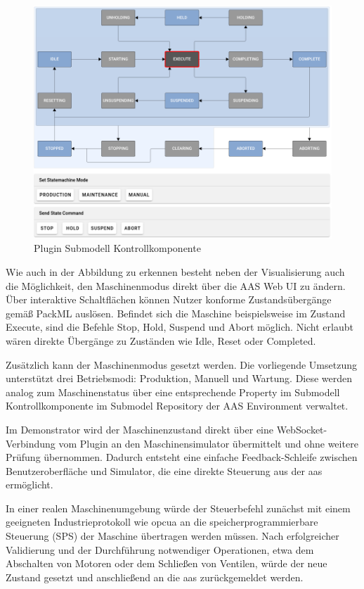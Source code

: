 \begin{figure}[htbp] 
    \centering 
        \includegraphics[width=1\textwidth]{Bilder/Ergebnisse/DynamischeDaten/Kontrollkomponente/PackMl.PNG} 
    \caption{Plugin Submodell Kontrollkomponente} 
    \label{fig:PackMLZustandsautomat} 
\end{figure}

Wie auch in der Abbildung zu erkennen besteht neben der Visualisierung auch die Möglichkeit, den Maschinenmodus direkt über die AAS Web UI zu ändern. 
Über interaktive Schaltflächen können Nutzer konforme Zustandsübergänge gemäß PackML auslösen. 
Befindet sich die Maschine beispielsweise im Zustand Execute, sind die Befehle Stop, Hold, Suspend und Abort möglich. 
Nicht erlaubt wären direkte Übergänge zu Zuständen wie Idle, Reset oder Completed.

Zusätzlich kann der Maschinenmodus gesetzt werden. 
Die vorliegende Umsetzung unterstützt drei Betriebsmodi: Produktion, Manuell und Wartung. 
Diese werden analog zum Maschinenstatus über eine entsprechende Property im Submodell Kontrollkomponente im Submodel Repository der AAS Environment verwaltet.

Im Demonstrator wird der Maschinenzustand direkt über eine WebSocket-Verbindung vom Plugin an den Maschinensimulator übermittelt und ohne weitere Prüfung übernommen. 
Dadurch entsteht eine einfache Feedback-Schleife zwischen Benutzeroberfläche und Simulator, die eine direkte Steuerung aus der \acs{aas} ermöglicht.

In einer realen Maschinenumgebung würde der Steuerbefehl zunächst mit einem geeigneten Industrieprotokoll wie \acs{opcua} an die speicherprogrammierbare Steuerung (SPS) der Maschine übertragen werden müssen. 
Nach erfolgreicher Validierung und der Durchführung notwendiger Operationen, etwa dem Abschalten von Motoren oder dem Schließen von Ventilen, würde der neue Zustand gesetzt und anschließend an die \acs{aas} zurückgemeldet werden.

